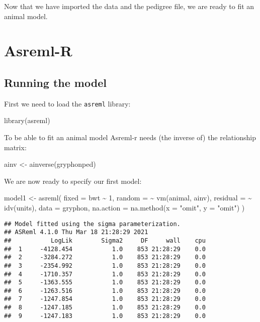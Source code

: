 \documentclass[
  12pt,
]{book}
\newenvironment{Shaded}{\begin{snugshade}}{\end{snugshade}}
\newcommand{\AttributeTok}[1]{\textcolor[rgb]{0.77,0.63,0.00}{#1}}
\newcommand{\DecValTok}[1]{\textcolor[rgb]{0.00,0.00,0.81}{#1}}
\newcommand{\FunctionTok}[1]{\textcolor[rgb]{0.00,0.00,0.00}{#1}}
\newcommand{\NormalTok}[1]{#1}
\newcommand{\OtherTok}[1]{\textcolor[rgb]{0.56,0.35,0.01}{#1}}
\newcommand{\SpecialCharTok}[1]{\textcolor[rgb]{0.00,0.00,0.00}{#1}}
\newcommand{\StringTok}[1]{\textcolor[rgb]{0.31,0.60,0.02}{#1}}
\begin{document}
Now that we have imported the data and the pedigree file, we are ready to fit an animal model.

\hypertarget{asreml-r-1}{%
\section{Asreml-R}\label{asreml-r-1}}

\hypertarget{running-the-model}{%
\subsection{Running the model}\label{running-the-model}}

First we need to load the \texttt{asreml} library:

\begin{Shaded}
\begin{Highlighting}[]
\FunctionTok{library}\NormalTok{(asreml)}
\end{Highlighting}
\end{Shaded}

To be able to fit an animal model Asreml-r needs (the inverse of) the relationship matrix:

\begin{Shaded}
\begin{Highlighting}[]
\NormalTok{ainv }\OtherTok{\textless{}{-}} \FunctionTok{ainverse}\NormalTok{(gryphonped)}
\end{Highlighting}
\end{Shaded}

We are now ready to specify our first model:

\begin{Shaded}
\begin{Highlighting}[]
\NormalTok{model1 }\OtherTok{\textless{}{-}} \FunctionTok{asreml}\NormalTok{(}
  \AttributeTok{fixed =}\NormalTok{ bwt }\SpecialCharTok{\textasciitilde{}} \DecValTok{1}\NormalTok{, }\AttributeTok{random =} \SpecialCharTok{\textasciitilde{}} \FunctionTok{vm}\NormalTok{(animal, ainv),}
  \AttributeTok{residual =} \SpecialCharTok{\textasciitilde{}} \FunctionTok{idv}\NormalTok{(units),}
  \AttributeTok{data =}\NormalTok{ gryphon,}
  \AttributeTok{na.action =} \FunctionTok{na.method}\NormalTok{(}\AttributeTok{x =} \StringTok{"omit"}\NormalTok{, }\AttributeTok{y =} \StringTok{"omit"}\NormalTok{)}
\NormalTok{)}
\end{Highlighting}
\end{Shaded}

\begin{verbatim}
## Model fitted using the sigma parameterization.
## ASReml 4.1.0 Thu Mar 18 21:28:29 2021
##           LogLik        Sigma2     DF     wall    cpu
##  1     -4128.454           1.0    853 21:28:29    0.0
##  2     -3284.272           1.0    853 21:28:29    0.0
##  3     -2354.992           1.0    853 21:28:29    0.0
##  4     -1710.357           1.0    853 21:28:29    0.0
##  5     -1363.555           1.0    853 21:28:29    0.0
##  6     -1263.516           1.0    853 21:28:29    0.0
##  7     -1247.854           1.0    853 21:28:29    0.0
##  8     -1247.185           1.0    853 21:28:29    0.0
##  9     -1247.183           1.0    853 21:28:29    0.0
\end{verbatim}
\end{document}
